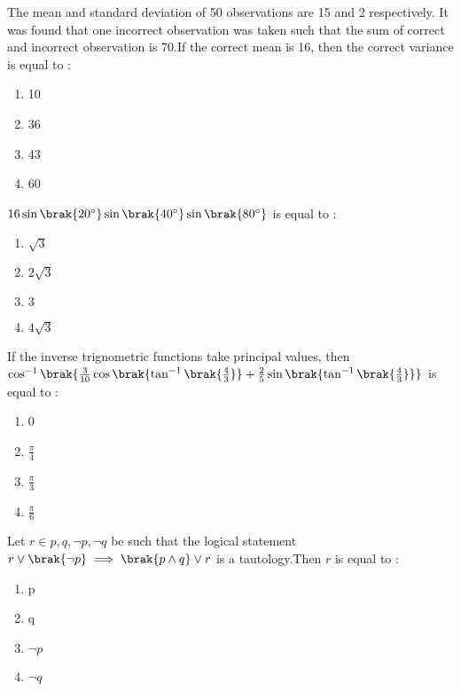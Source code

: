     \item[2.] The mean and standard deviation of 50 observations are 15 and 2 respectively. It was found that one incorrect observation was taken such that the sum of correct and incorrect observation is 70.If the correct mean is 16, then the correct variance is equal to :
    \hfill{}
   \begin{enumerate}
        \item 10
        \item 36
        \item 43
        \item 60
    \end{enumerate}
    \item[3.] $16\sin{\brak{20^\circ}}\sin{\brak{40^\circ}}\sin{\brak{80^\circ}}$ is equal to :
    \hfill{}
    \begin{enumerate}
        \item $\sqrt{3}$
        \item $2\sqrt{3}$
        \item $3$
        \item $4\sqrt{3}$
    \end{enumerate}
    \item[4.] If the inverse trignometric functions take principal values, then $\cos^{-1}\brak{\frac{3}{10}\cos\brak{\tan^{-1}\brak{\frac{4}{3}}}+\frac{2}{5}\sin\brak{\tan^{-1}\brak{\frac{4}{3}}}}$ is equal to :
 \hfill{}
    \begin{enumerate}
        \item 0
        \item $\frac{\pi}{4}$
        \item $\frac{\pi}{3}$
        \item $\frac{\pi}{6}$
    \end{enumerate}   
    \item[5.] Let $r \in {p,q,\neg p,\neg q}$ be such that the logical statement $r\lor \brak{\neg p}\implies\brak{p\land q}\lor r$ is a tautology.Then $r$ is equal to :
    \hfill{}
    \begin{enumerate}
        \item p
        \item q
        \item $\neg p$
        \item $\neg q$
    \end{enumerate}
